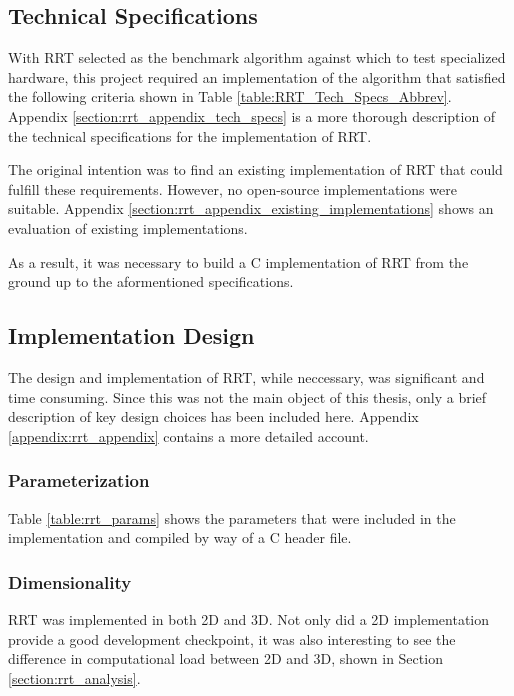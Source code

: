 

\subsection{Technical Specifications}

    With \gls{RRT} selected as the benchmark algorithm against which to test specialized hardware, this project required an implementation of the algorithm that satisfied the following criteria shown in Table \ref{table:RRT_Tech_Specs_Abbrev}. Appendix \ref{section:rrt_appendix_tech_specs} is a more thorough description of the technical specifications for the implementation of RRT. 

    

    The original intention was to find an existing implementation of RRT that could fulfill these requirements. However, no open-source implementations were suitable. Appendix \ref{section:rrt_appendix_existing_implementations} shows an evaluation of existing implementations.

    As a result, it was necessary to build a C implementation of RRT from the ground up to the aformentioned specifications.

\subsection{Implementation Design}
    The design and implementation of \gls{RRT}, while neccessary, was significant and time consuming. Since this was not the main object of this thesis, only a brief description of key design choices has been included here. Appendix \ref{appendix:rrt_appendix} contains a more detailed account.

    \subsubsection{Parameterization}
        Table \ref{table:rrt_params} shows the parameters that were included in the implementation and compiled by way of a C header file.
        

    \subsubsection{Dimensionality}
        \gls{RRT} was implemented in both \gls{2D} and \gls{3D}. Not only did a \gls{2D} implementation provide a good development checkpoint, it was also interesting to see the difference in computational load between \gls{2D} and \gls{3D}, shown in Section \ref{section:rrt_analysis}.

